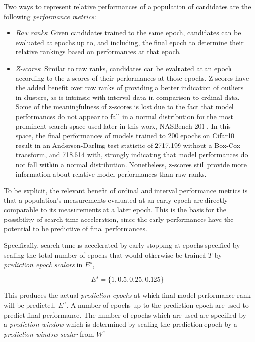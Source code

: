 \documentclass[twocolumn]{article}
\begin{document}
Two ways to represent relative performances of a population of candidates are the following \emph{performance metrics}:
\begin{itemize}
    \item \emph{Raw ranks}: Given candidates trained to the same epoch, 
        candidates can be evaluated at epochs up to, and including, the final epoch to determine their relative rankings based on performances at that epoch.
    \item \emph{Z-scores}: Similar to raw ranks, candidates can be evaluated at an epoch according to the z-scores of their performances at those epochs.
        Z-scores have the added benefit over raw ranks of providing a better indication of outliers in clusters, as is intrinsic with interval data 
        in comparison to ordinal data.
        Some of the meaningfulness of z-scores is lost due to the fact that model performances do not appear to fall in a normal distribution for the most prominent 
        search space used later in this work, NASBench 201 \cite{nasbench201}.
        In this space, the final performances of models trained to 200 epochs on Cifar10 result in an Anderson-Darling test statistic of 2717.199 without a 
        Box-Cox transform, and 718.514 with, strongly indicating that model performances do not fall within a normal distribution.
        Nonetheless, z-scores still provide more information about relative model performances than raw ranks.

\end{itemize}

To be explicit, the relevant benefit of ordinal and interval performance metrics is that a population's measurements evaluated at an early epoch are 
directly comparable to its measurements at a later epoch. 
This is the basis for the possibility of search time acceleration, since the early performances have the potential to be predictive of final performances.

Specifically, search time is accelerated by early stopping at epochs specified by scaling the total number of epochs that would otherwise be trained $T$ by 
\emph{prediction epoch scalars} in $E^s$,

\[E^s = \{1, 0.5, 0.25, 0.125\}\]

This produces the actual \emph{prediction epochs} at which final model performance rank will be predicted, $E^{a}$.
A number of epochs up to the prediction epoch are used to predict final performance. 
The number of epochs which are used are specified by a \emph{prediction window} which is determined by scaling the prediction epoch
by a \emph{prediction window scalar} from $W^s$
\end{document}
